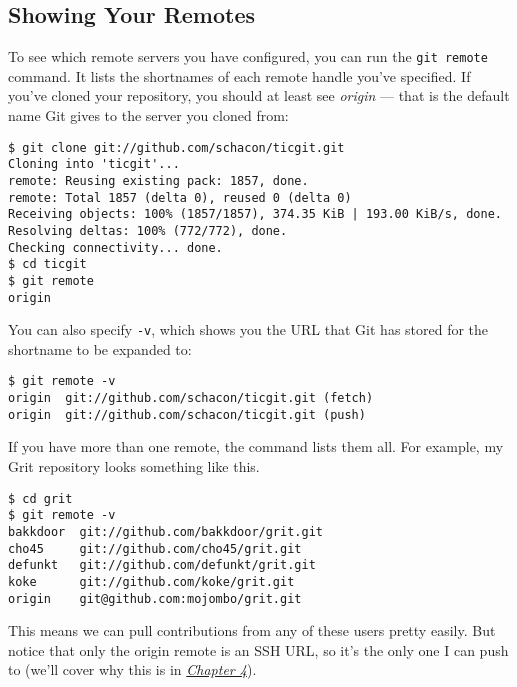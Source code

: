 \documentclass[a4paper]{book}
\newcommand{\prechap}{Chapter }
\newcommand{\postchap}{}
\newcommand{\chapref}[1]{\hyperref[chap:#1]{\prechap #1\postchap}}
\begin{document}
\subsection{Showing Your Remotes}\label{showing-your-remotes}

To see which remote servers you have configured, you can run the \texttt{git remote} command. It lists the shortnames of each remote handle you've specified. If you've cloned your repository, you should at least see \emph{origin} --- that is the default name Git gives to the server you cloned from:

\begin{shaded}\begin{verbatim}
$ git clone git://github.com/schacon/ticgit.git
Cloning into 'ticgit'...
remote: Reusing existing pack: 1857, done.
remote: Total 1857 (delta 0), reused 0 (delta 0)
Receiving objects: 100% (1857/1857), 374.35 KiB | 193.00 KiB/s, done.
Resolving deltas: 100% (772/772), done.
Checking connectivity... done.
$ cd ticgit
$ git remote
origin
\end{verbatim}\end{shaded}

You can also specify \texttt{-v}, which shows you the URL that Git has stored for the shortname to be expanded to:

\begin{shaded}\begin{verbatim}
$ git remote -v
origin  git://github.com/schacon/ticgit.git (fetch)
origin  git://github.com/schacon/ticgit.git (push)
\end{verbatim}\end{shaded}

If you have more than one remote, the command lists them all. For example, my Grit repository looks something like this.

\begin{shaded}\begin{verbatim}
$ cd grit
$ git remote -v
bakkdoor  git://github.com/bakkdoor/grit.git
cho45     git://github.com/cho45/grit.git
defunkt   git://github.com/defunkt/grit.git
koke      git://github.com/koke/grit.git
origin    git@github.com:mojombo/grit.git
\end{verbatim}\end{shaded}

This means we can pull contributions from any of these users pretty easily. But notice that only the origin remote is an SSH URL, so it's the only one I can push to (we'll cover why this is in \emph{\chapref{4}}).
\end{document}
